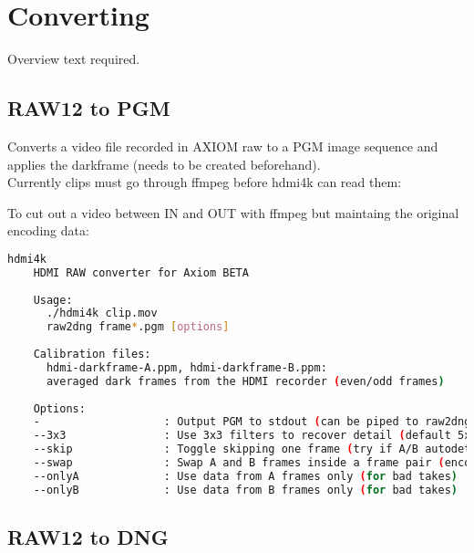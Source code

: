 \section{Converting}

Overview text required.




\subsection{RAW12 to PGM}

Converts a video file recorded in AXIOM raw to a PGM image sequence and applies the darkframe (needs to be created beforehand).\\

Currently clips must go through ffmpeg before hdmi4k can read them:\\ 


To cut out a video between IN and OUT with ffmpeg but maintaing the original encoding data:



\begin{lstlisting}[language=bash,morekeywords=$,keywordstyle=\bfseries,frame=none,xleftmargin=.25in,belowskip=2em, aboveskip=2em]
	hdmi4k
    HDMI RAW converter for Axiom BETA
     
    Usage:
      ./hdmi4k clip.mov
      raw2dng frame*.pgm [options]
     
    Calibration files:
      hdmi-darkframe-A.ppm, hdmi-darkframe-B.ppm:
      averaged dark frames from the HDMI recorder (even/odd frames)
     
    Options:
    -                   : Output PGM to stdout (can be piped to raw2dng)
    --3x3               : Use 3x3 filters to recover detail (default 5x5)
    --skip              : Toggle skipping one frame (try if A/B autodetection fails)
    --swap              : Swap A and B frames inside a frame pair (encoding bug?)
    --onlyA             : Use data from A frames only (for bad takes)
    --onlyB             : Use data from B frames only (for bad takes)
\end{lstlisting}

\subsection{RAW12 to DNG}


